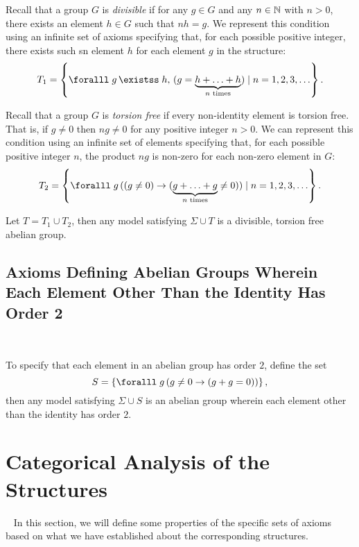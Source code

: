 \begin{enumarabic}
  \item Recall that a group $G$ is \emph{divisible} if for any $g \in G$
    and any $n \in \mathbb{N}$ with $n > 0$, there exists an element $h \in G$
    such that $n h = g$.
    We represent this condition using an infinite set of axioms
    specifying that, for each possible positive integer,
    there exists such sn element $h$ for each element $g$ in the structure:
    \[ T_1 = \set{ \forall g\, \exists h,\, (g = \underbrace{h + \ldots + h}_{\text{$n$ times}}) \mid n = 1, 2, 3, \ldots }. \]
    
  \item Recall that a group $G$ is \emph{torsion free} if every non-identity element
    is torsion free. That is, if $g \neq 0$ then $ng \neq 0$ for any positive
    integer $n > 0$.
    We can represent this condition using an infinite set of elements
    specifying that, for each possible positive integer $n$,
    the product $ng$ is non-zero for each non-zero element in $G$:
    \[ T_2 = \set{ \forall g\, ( (g \neq 0) \lto (\underbrace{g + \ldots + g}_{\text{$n$ times}} \neq 0)) \mid n = 1, 2, 3, \ldots }. \]
    
\end{enumarabic}

Let $T = T_1 \cup T_2$, then any model satisfying $\Sigma \cup T$
is a divisible, torsion free abelian group.



\subsection{Axioms Defining Abelian Groups Wherein Each Element Other Than the Identity
Has Order 2}~\label{sec:axioms-order-two-elements}

To specify that each element in an abelian group has order $2$,
define the set
\[ S = \set{\forall g\, ( g \neq 0 \lto (g + g = 0) ) }, \]
then any model satisfying $\Sigma \cup S$ is an abelian group
wherein each element other than the identity has order $2$.


\section{Categorical Analysis of the Structures}~\label{sec:categorical-analysis}
In this section, we will define some properties of the specific sets of axioms
based on what we have established about the corresponding structures.

